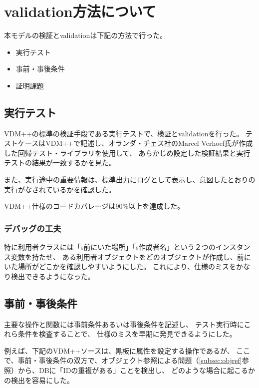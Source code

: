 \documentclass[a4paper,8pt]{jsarticle}
\begin{document}
\newpage

\section {validation方法について}
\label{sec:validation}
本モデルの検証とvalidationは下記の方法で行った。

\begin{itemize}
	\item 実行テスト
	\item 事前・事後条件
	\item 証明課題
\end{itemize}


\subsection {実行テスト}
VDM++の標準の検証手段である実行テストで、検証とvalidationを行った。
テストケースはVDM++で記述し、オランダ・チェス社のMarcel Verhoef氏が作成した回帰テスト・ライブラリを使用して、
あらかじめ設定した検証結果と実行テストの結果が一致するかを見た。

また、実行途中の重要情報は、標準出力にログとして表示し、意図したとおりの実行がなされているかを確認した。

VDM++仕様のコードカバレージは90\%以上を達成した。

\subsubsection{デバッグの工夫}
特に利用者クラスには「s前にいた場所」「s作成者名」という２つのインスタンス変数を持たせ、
ある利用者オブジェクトをどのオブジェクトが作成し、前にいた場所がどこかを確認しやすいようにした。
これにより、仕様のミスをかなり検出できるようになった。

\subsection {事前・事後条件}
\label{subsec:prePost}
主要な操作と関数には事前条件あるいは事後条件を記述し、
テスト実行時にこれら条件を検査することで、
仕様のミスを早期に発見できるようにした。

例えば、下記のVDM++ソースは、黒板に属性を設定する操作であるが、
ここで、事前・事後条件の双方で、オブジェクト参照による問題（\ref{subsec:objref}参照）から、DBに「IDの重複がある」ことを検出し、
どのような場合に起こるかの検出を容易にした。
\end{document}
